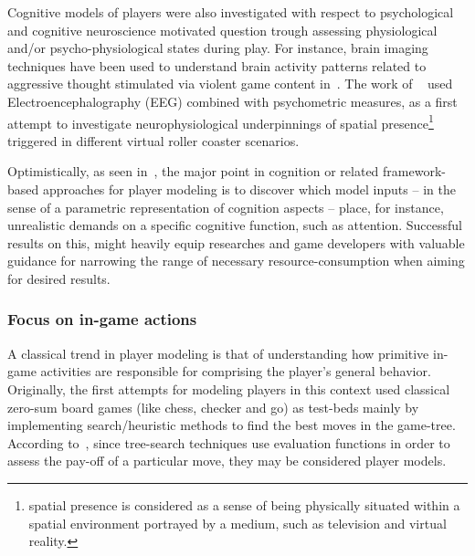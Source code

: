Cognitive models of players were also investigated with respect to psychological and cognitive neuroscience motivated question trough assessing physiological and/or psycho-physiological states during play. For instance, brain imaging techniques have been used to understand brain activity patterns related to aggressive thought stimulated via violent game content in~\cite{weber_does_2006}. The work of ~\cite{baumgartner_neural_2006} used Electroencephalography (EEG) combined with psychometric measures, as a first attempt to investigate neurophysiological underpinnings of spatial presence\footnote{spatial presence is considered as a sense of being physically situated within a spatial environment portrayed by a medium, such as television and virtual reality.} triggered in different virtual roller coaster scenarios.

Optimistically, as seen in~\cite{bohil_cognitive_2007}, the major point in cognition or related framework-based approaches for player modeling is to discover which model inputs -- in the sense of a parametric representation of cognition aspects -- place, for instance, unrealistic demands on a specific cognitive function, such as attention. Successful results on this, might heavily equip researches and game developers with valuable guidance for narrowing the range of necessary resource-consumption when aiming for desired results.   

\subsubsection{Focus on in-game actions}
A classical trend in player modeling is that of understanding how primitive in-game activities are responsible for comprising the player's general behavior. Originally, the first attempts for modeling players in this context used classical zero-sum board games (like chess, checker and go) as test-beds mainly by implementing search/heuristic methods to find the best moves in the game-tree. According to~\cite{bakkes_player_2012}, since tree-search techniques use evaluation functions in order to assess the pay-off of a particular move, they may be considered player models.

